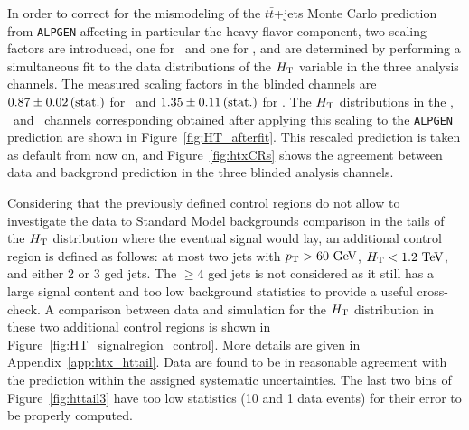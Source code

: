 In order to correct for the mismodeling of the $t\bar{t}$+jets 
Monte Carlo prediction from \texttt{ALPGEN} affecting in
particular the heavy-flavor component, two scaling factors are
introduced, one for \ttlf\ and one for \tthf, and are determined
by performing a simultaneous fit to the data distributions
of the $\HT$  variable in the three analysis channels. 
The measured scaling factors in the blinded channels are 
$0.87 \pm 0.02\,{\rm (stat.)}$ for \ttlf\ and 
$1.35 \pm 0.11\,{\rm (stat.)}$ for \tthf.
The $\HT$ distributions in the \chii, \chiii\ and \chiv\ 
channels corresponding obtained after applying this scaling
to the \texttt{ALPGEN} prediction are shown in Figure~\ref{fig:HT_afterfit}.
This rescaled prediction is taken as default from now on, and
Figure~\ref{fig:htxCRs} shows the agreement between data and
backgrond prediction in the three blinded analysis channels.



Considering that the previously defined control regions do not allow
to investigate the data to Standard Model backgrounds comparison in
the tails of the $\HT$ distribution where the eventual signal would lay,
an additional control region is defined as follows: 
at most two jets with $\pt>60\gev$, $\HT<1.2\tev$, and either 2 or 3 \btag ged jets.
The  $\geq 4$ \btag ged jets is not considered as it still has 
a large signal content and too low background statistics to provide
a useful cross-check.
A comparison between data and simulation for the $\HT$ distribution 
in these two additional control regions is shown in 
Figure~\ref{fig:HT_signalregion_control}. More details are given 
in Appendix~\ref{app:htx_httail}.
Data are found to be in reasonable agreement with the 
prediction within the assigned systematic uncertainties. 
The last two bins of Figure~\ref{fig:httail3} have too low
statistics (10 and 1 data events) for their error to be properly computed.

